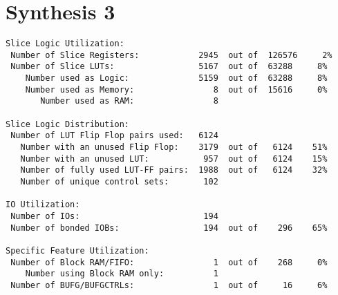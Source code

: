 \section{Synthesis 3}
\begin{verbatim}
Slice Logic Utilization: 
 Number of Slice Registers:            2945  out of  126576     2%  
 Number of Slice LUTs:                 5167  out of  63288     8%  
    Number used as Logic:              5159  out of  63288     8%  
    Number used as Memory:                8  out of  15616     0%  
       Number used as RAM:                8

Slice Logic Distribution: 
 Number of LUT Flip Flop pairs used:   6124
   Number with an unused Flip Flop:    3179  out of   6124    51%  
   Number with an unused LUT:           957  out of   6124    15%  
   Number of fully used LUT-FF pairs:  1988  out of   6124    32%  
   Number of unique control sets:       102

IO Utilization: 
 Number of IOs:                         194
 Number of bonded IOBs:                 194  out of    296    65%  

Specific Feature Utilization:
 Number of Block RAM/FIFO:                1  out of    268     0%  
    Number using Block RAM only:          1
 Number of BUFG/BUFGCTRLs:                1  out of     16     6%  
\end{verbatim}
